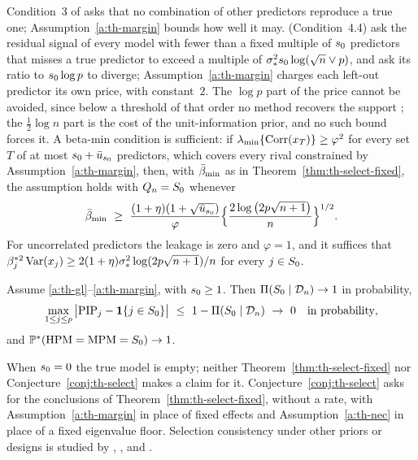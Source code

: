 \begin{remark}\label{rem:th-margin}
Condition~3 of \citet{SongLiang2015} asks that no combination of other predictors reproduce a true one;
Assumption~\ref{a:th-margin} bounds how well it may. \citet{NarisettyHe2014} (Condition~4.4) ask the residual signal of
every model with fewer than a fixed multiple of $s_0$ predictors that misses a true predictor to exceed a multiple of $\sigma_*^2s_0\log(\sqrt n\vee p)$, and
\citet{LuoChen2013} ask its ratio to $s_0\log p$ to diverge; Assumption~\ref{a:th-margin} charges each left-out predictor
its own price, with constant~$2$. The $\log p$ part of the price cannot be avoided, since below a threshold of that
order no method recovers the support \citep{WainwrightIT2009,FletcherRanganGoyal2009}; the $\tfrac12\log n$ part is the
cost of the unit-information prior, and no such bound forces it. A beta-min condition is sufficient: if
$\lambda_{\min}\{\operatorname{Corr}(x_T)\}\ge\varphi^2$ for every set $T$ of at most $s_0+\bar u_{s_0}$ predictors, which covers every
rival constrained by Assumption~\ref{a:th-margin}, then, with $\bar\beta_{\min}$ as in Theorem~\ref{thm:th-select-fixed}, the
assumption holds with $Q_n=S_0$ whenever
\[
  \bbmin\ \ge\ \frac{(1+\eta)(1+\sqrt{\bar u_{\sz}})}{\varphi}
  \Big\{\frac{2\log\big(2p\sqrt{n+1}\big)}{n}\Big\}^{1/2}.
\]
For uncorrelated predictors the leakage is zero and $\varphi=1$, and it suffices that
$\beta_j^{*2}\operatorname{Var}(x_j)\ge2(1+\eta)\sigma_*^2\log(2p\sqrt{n+1})/n$ for every $j\in S_0$.
\end{remark}

\begin{conjecture}\label{conj:th-select}
Assume \ref{a:th-gl}--\ref{a:th-margin}, with $s_0\ge1$. Then $\Pi(S_0\mid\mathcal D_n)\to1$ in probability,
\[
  \max_{1\le j\le p}\big\lvert\PIP_j-\ind{j\in\Sz}\big\rvert\ \le\ 1-\Pin{\Sz}\ \to\ 0\quad\text{in probability},
\]
and $\mathbb{P}^*(\mathrm{HPM}=\mathrm{MPM}=S_0)\to1$.
\end{conjecture}

When $s_0=0$ the true model is empty; neither Theorem~\ref{thm:th-select-fixed} nor
Conjecture~\ref{conj:th-select} makes a claim for it. Conjecture~\ref{conj:th-select} asks for the conclusions of Theorem~\ref{thm:th-select-fixed}, without a rate, with
Assumption~\ref{a:th-margin} in place of fixed effects and Assumption~\ref{a:th-nec} in place of a fixed eigenvalue
floor. Selection consistency under other priors or designs is studied by \citet{ShangClayton2011},
\citet{NarisettyHe2014}, \citet{CastilloSchmidtHieberVanDerVaart2015} and \citet{Rossell2022}.


